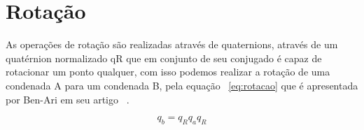 \section{Rotação}

As operações de rotação são realizadas através de quaternions, através de um quatérnion normalizado qR que em conjunto de seu conjugado é capaz de rotacionar um ponto qualquer,  com isso podemos realizar a rotação de uma condenada A para um condenada B, pela equação ~\ref{eq:rotacao} que é apresentada por Ben-Ari em seu artigo ~\cite[]{Ben-Ari}. 

\begin{equation}
    q_b = q_Rq_aq_R
    \label{eq:rotacao}
\end{equation}